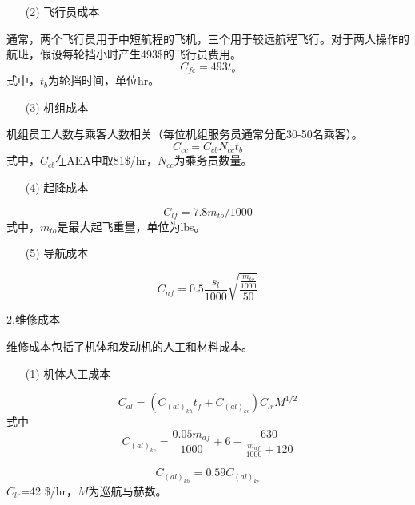 \documentclass[12pt,a4paper]{report}
\begin{document}
\begin{itemize}
    \item[(2)] 飞行员成本
\end{itemize}
通常，两个飞行员用于中短航程的飞机，三个用于较远航程飞行。对于两人操作的航班，假设每轮挡小时产生493\$的飞行员费用。
\begin{equation}
\label{eq:flightcrewcost}
C_{fc}=493t_b
\end{equation}
式中，$t_b$为轮挡时间，单位hr。
\begin{itemize}
    \item[(3)] 机组成本
\end{itemize}
机组员工人数与乘客人数相关（每位机组服务员通常分配30-50名乘客）。
\begin{equation}
\label{eq:cabincrewcost}
C_{cc}=C_{cb}N_{cc}t_b
\end{equation}
式中，$C_{cb}$在AEA中取81\$/hr，$N_{cc}$为乘务员数量。
\begin{itemize}
    \item[(4)] 起降成本
\end{itemize}
\begin{equation}
\label{eq:landingfee}
C_{lf}=7.8m_{to}/1000
\end{equation}
式中，$m_{to}$是最大起飞重量，单位为lbs。
\begin{itemize}
    \item[(5)] 导航成本
\end{itemize}
\begin{equation}
\label{eq:navigationfee}
C_{nf}=0.5\frac{s_l}{1000}\sqrt{\frac{\frac{m_{to}}{1000}}{50}}
\end{equation}

2.维修成本

维修成本包括了机体和发动机的人工和材料成本。
\begin{itemize}
    \item[(1)] 机体人工成本
\end{itemize}
\begin{equation}
\label{eq:airframelabor}
C_{al}=(C_{(al)_{kh}}t_f+C_{(al)_{kc}})C_{lr}M^{1/2}
\end{equation}
式中\begin{equation}
\label{eq:alkc}
C_{(al)_{kc}}=\frac{0.05m_{af}}{1000}+6-\frac{630}{\frac{m_{af}}{1000}+120}
\end{equation}

\begin{equation}
\label{eq:alkh}
C_{(al)_{kh}}=0.59C_{(al)_{kc}}
\end{equation}
$C_{lr}$=42 \$/hr，$M$为巡航马赫数。
\end{document}
